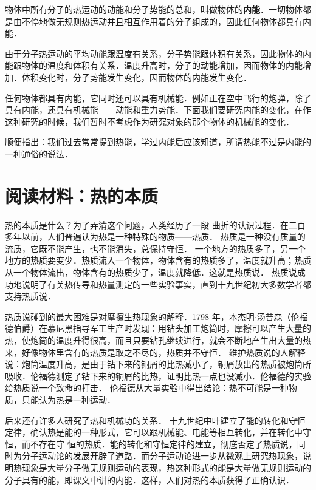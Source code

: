 物体中所有分子的热运动的动能和分子势能的总和，叫做物体的\textbf{内能}．一切物体都是由不停地做无规则热运动并且相互作用着的分子组成的，因此任何物体都具有内能．

由于分子热运动的平均动能跟温度有关系，分子势能跟体积有关系，因此物体的内能跟物体的温度和体积有关系．温度升高时，分子的动能增加，因而物体的内能增加．体积变化时，分子势能发生变化，因而物体的内能发生变化．

任何物体都具有内能，它同时还可以具有机械能．例如正在空中飞行的炮弹，除了具有内能，还具有机械能——动能和重力势能．下面我们要研究内能的变化，在作这种研究的时候，我们暂时不考虑作为研究对象的那个物体的机械能的变化．

顺便指出：我们过去常常提到热能，学过内能后应该知道，所谓热能不过是内能的一种通俗的说法．

\section*{阅读材料：热的本质}
热的本质是什么？为了弄清这个问题，人类经历了一段
曲折的认识过程．在二百多年以前，人们普遍认为热是一种特殊的物质——热质．
热质是一种没有质量的流质，它既不能产生，也不能消失，总保持守恒．
一个地方的热质多了，另一个地方的热质要变少．热质流入一个物体，物体含有的热质多了，温度就升高；热质从一个物体流出，物体含有的热质少了，温度就降低．这就是热质说．
热质说成功地说明了有关热传导和热量测定的一些实验事实，直到十九世纪初大多数学者都支持热质说．

热质说碰到的最大困难是对摩擦生热现象的解释．1798
年，本杰明$\cdot$汤普森（伦福德伯爵）在慕尼黑指导军工生产时发现：用钻头加工炮筒时，摩擦可以产生大量的热，使炮筒的温度升得很高，而且只要钻孔继续进行，就会不断地产生出大量的热来，好像物体里含有的热质是取之不尽的，热质并不守恒．
维护热质说的人解释说：炮筒温度升高，是由于钻下来的铜屑的比热减小了，铜屑放出的热质被炮筒所吸收．伦福德测定了钻下来的铜屑的比热，证明比热一点也没减小．伦福德的实验给热质说一个致命的打击．
伦福德从大量实验中得出结论：热不可能是一种物质，只能认为热是一种运动．

后来还有许多人研究了热和机械功的关系．
十九世纪中叶建立了能的转化和守恒定律，确认热是能的一种形式，它可以跟机械能、电能等相互转化，并在转化中守恒，而不存在守
恒的热质．能的转化和守恒定律的建立，彻底否定了热质说，同时为分子运动论的发展开辟了道路．而分子运动论进一步从微观上研究热现象，说明热现象是大量分子做无规则运动的表现，热这种形式的能是大量做无规则运动的分子具有的能，即课文中讲的内能．这样，人们对热的本质获得了正确认识．


